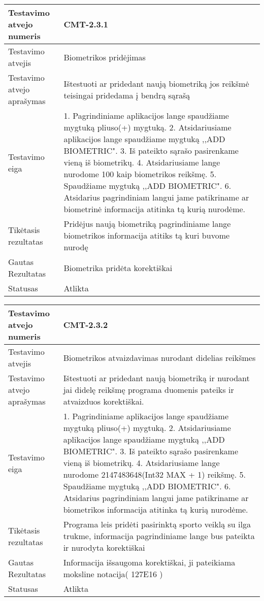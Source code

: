 \documentclass[oneside]{VUMIFPSkursinis}
\begin{document}
\begin{center}
    \begin{tabular}{ |p{5cm}|p{13cm}|}
    \hline
    	Testavimo atvejo numeris & CMT-2.3.1\\ \hline
    	Testavimo atvejis & Biometrikos pridėjimas \\ \hline
	Testavimo atvejo aprašymas & Ištestuoti ar pridedant naują biometriką jos reikšmė teisingai pridedama į bendrą sąrašą   \\ \hline
	Testavimo eiga & 1. Pagrindiniame aplikacijos lange spaudžiame mygtuką pliuso(+) mygtuką. 
				2. Atsidariusiame aplikacijos lange spaudžiame mygtuką ,,ADD BIOMETRIC". 
				3. Iš pateikto sąrašo pasirenkame vieną iš biometrikų. 
				4. Atsidariusiame lange nurodome 100 kaip biometrikos reikšmę.
				5. Spaudžiame mygtuką ,,ADD BIOMETRIC".
				6. Atsidarius pagrindiniam langui jame patikriname ar biometrinė informacija atitinka tą kurią nurodėme.\\ \hline
	Tikėtasis rezultatas &  Pridėjus naują biometriką pagrindiniame lange biometrikos informacija atitiks tą kuri buvome nurodę\\ \hline
	Gautas Rezultatas & Biometrika pridėta korektiškai  \\ \hline
	Statusas &  Atlikta\\ \hline
    \hline
    \end{tabular}
\end{center}

\begin{center}
    \begin{tabular}{ |p{5cm}|p{13cm}|}
    \hline
    	Testavimo atvejo numeris & CMT-2.3.2  \\ \hline
    	Testavimo atvejis & Biometrikos atvaizdavimas nurodant didelias reikšmes  \\ \hline
	Testavimo atvejo aprašymas & Ištestuoti ar pridedant naują biometriką ir nurodant jai didelę reikšmę programa duomenis pateiks ir atvaizduos korektiškai.  \\ \hline
	Testavimo eiga & 1. Pagrindiniame aplikacijos lange spaudžiame mygtuką pliuso(+) mygtuką. 
				2. Atsidariusiame aplikacijos lange spaudžiame mygtuką ,,ADD BIOMETRIC". 
				3. Iš pateikto sąrašo pasirenkame vieną iš biometrikų. 
				4. Atsidariusiame lange nurodome 2147483648(Int32 MAX + 1) reikšmę.
				5. Spaudžiame mygtuką ,,ADD BIOMETRIC".
				6. Atsidarius pagrindiniam langui jame patikriname ar biometrikos informacija atitinka tą kurią nurodėme.\\ \hline
	Tikėtasis rezultatas & Programa leis pridėti pasirinktą sporto veiklą su ilga trukme, informacija pagrindiniame lange bus pateikta ir nurodyta korektiškai  \\ \hline
	Gautas Rezultatas & Informacija išsaugoma korektiškai, ji pateikiama moksline notacija( 127E16 )  \\ \hline
	Statusas & Atlikta  \\ \hline
    \hline
    \end{tabular}
\end{center}
\end{document}
